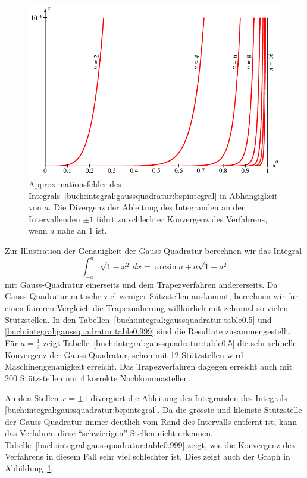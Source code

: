 \begin{figure}
\centering
\includegraphics{chapters/060-integral/gq/gq.pdf}
\caption{Approximationsfehler des
Integrals~\eqref{buch:integral:gaussquadratur:bspintegral}
in Abhängigkeit von $a$.
Die Divergenz der Ableitung des Integranden an den Intervallenden
$\pm 1$ führt zu schlechter Konvergenz des Verfahrens, wenn $a$
nahe an $1$ ist.
\label{buch:integral:gaussquadratur:fehler}}
\end{figure}

Zur Illustration der Genauigkeit der Gauss-Quadratur berechnen wir
das Integral
\begin{equation}
\int_{-a}^a \sqrt{1-x^2}\,dx
=
\arcsin a + a \sqrt{1-a^2}
\label{buch:integral:gaussquadratur:bspintegral}
\end{equation}
mit Gauss-Quadratur einerseits und dem Trapezverfahren
andererseits.
Da Gauss-Quadratur mit sehr viel weniger Sützstellen auskommt,
berechnen wir für einen faireren Vergleich die Trapeznäherung
willkürlich mit zehnmal so vielen Stützstellen.
In den Tabellen~\ref{buch:integral:gaussquadratur:table0.5}
und
\ref{buch:integral:gaussquadratur:table0.999}
sind die Resultate zusammengestellt.
Für $a =\frac12$ zeigt
Tabelle~\ref{buch:integral:gaussquadratur:table0.5}
die sehr schnelle Konvergenz der Gauss-Quadratur, schon mit
12 Stützstellen wird Maschinengenauigkeit erreicht.
Das Trapezverfahren dagegen erreicht auch mit 200 Stützstellen nur
4 korrekte Nachkommastellen.

An den Stellen $x=\pm 1$ divergiert die Ableitung des Integranden
des Integrals \eqref{buch:integral:gaussquadratur:bspintegral}.
Da die grösste und kleinste Stützstelle der Gauss-Quadratur immer
deutlich vom Rand des Intervalls entfernt ist, kann das Verfahren
diese ``schwierigen'' Stellen nicht erkennen.
Tabelle~\ref{buch:integral:gaussquadratur:table0.999} zeigt, wie
die Konvergenz des Verfahrens in diesem Fall sehr viel schlechter ist.
Dies zeigt auch der Graph in
Abbildung~\ref{buch:integral:gaussquadratur:fehler}.

